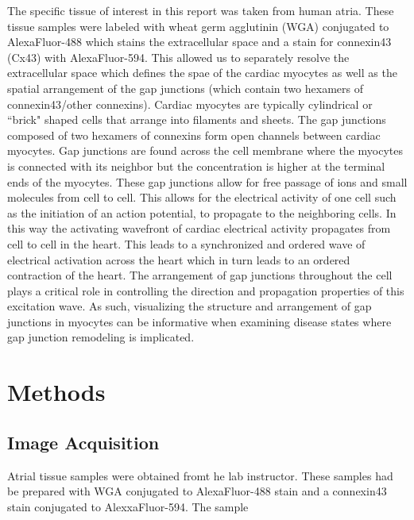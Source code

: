 \documentclass[12pt]{article}
\begin{document}
The specific tissue of interest in this report was taken from human atria. These tissue samples were labeled with wheat  germ  agglutinin (WGA)  conjugated  to  AlexaFluor-488 which stains the extracellular space and a stain for connexin43 (Cx43) with AlexaFluor-594. This allowed us to separately resolve the extracellular space which defines the spae of the cardiac myocytes as well as the spatial arrangement of the gap junctions (which contain two hexamers of connexin43/other connexins). Cardiac myocytes are typically cylindrical or ``brick" shaped cells that arrange into filaments and sheets.\cite{Woodcock2005} The gap junctions composed of two hexamers of connexins form open channels between cardiac myocytes. Gap junctions are found across the cell membrane where the myocytes is connected with its neighbor but the concentration is higher at the terminal ends of the myocytes.\cite{Mese2007} These gap junctions allow for free passage of ions and small molecules from cell to cell. This allows for the electrical activity of one cell such as the initiation of an action potential, to propagate to the neighboring cells. In this way the activating wavefront of cardiac electrical activity propagates from cell to cell in the heart. This leads to a synchronized and ordered wave of electrical activation across the heart which in turn leads to an ordered contraction of the heart.\cite{Mese2007} The arrangement of gap junctions throughout the cell plays a critical role in controlling the direction and propagation properties of this excitation wave. As such, visualizing the structure and arrangement of gap junctions in myocytes can be informative when examining disease states where gap junction remodeling is implicated.

\section{Methods}
\subsection{Image Acquisition}
Atrial tissue samples were obtained fromt he lab instructor. These samples had be prepared with WGA conjugated to AlexaFluor-488 stain and a connexin43 stain conjugated to AlexxaFluor-594. The sample 



\end{document}
